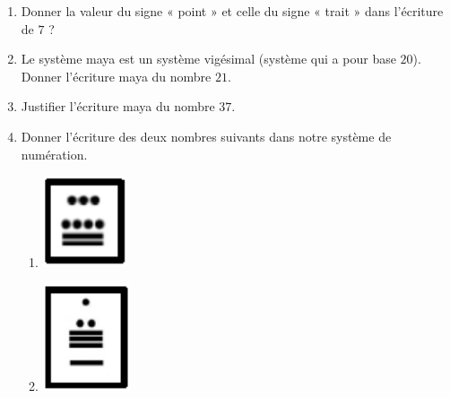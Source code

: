 \begin{enumerate}
\item Donner la valeur du signe « point » et celle du signe « trait » dans l’écriture de $7$ ?
\item Le système maya est un système vigésimal (système qui a pour base $20$). Donner
l’écriture maya du nombre $21$.
\item Justifier l'écriture maya du nombre $37$.
\item Donner l'écriture des deux nombres suivants dans notre système de numération.\par 
\begin{minipage}{3cm}
\begin{enumerate}
	\item \includegraphics[width=.7\textwidth]{./images/2022-g2-ex5-img3.png}
\end{enumerate}
\end{minipage}
\begin{minipage}{3cm}
\begin{enumerate}
	\setcounter{enumii}{1}
	\item \includegraphics[width=.6\textwidth]{./images/2022-g2-ex5-img4.png}

\end{enumerate}
\end{minipage}
\end{enumerate}
